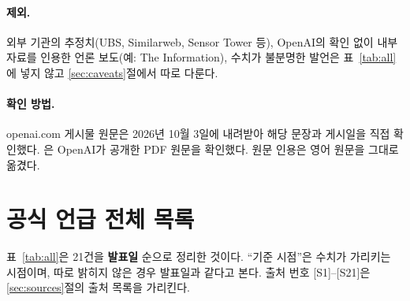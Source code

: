 \documentclass[11pt]{article}
\begin{document}
\paragraph{제외.} 외부 기관의 추정치(UBS, Similarweb, Sensor Tower 등), OpenAI의 확인 없이 내부 자료를 인용한 언론 보도(예: The Information), 수치가 불분명한 발언은 표~\ref{tab:all}에 넣지 않고 \ref{sec:caveats}절에서 따로 다룬다.

\paragraph{확인 방법.} openai.com 게시물 원문은 2026년 10월 3일에 내려받아 해당 문장과 게시일을 직접 확인했다. \textcite{chatterji-2025-how-people-use-chatgpt}은 OpenAI가 공개한 PDF 원문을 확인했다. 원문 인용은 영어 원문을 그대로 옮겼다.

\section{공식 언급 전체 목록}

표~\ref{tab:all}은 21건을 \textbf{발표일} 순으로 정리한 것이다. ``기준 시점''은 수치가 가리키는 시점이며, 따로 밝히지 않은 경우 발표일과 같다고 본다. 출처 번호 [S1]--[S21]은 \ref{sec:sources}절의 출처 목록을 가리킨다.
\end{document}
